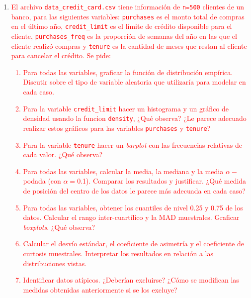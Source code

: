 \documentclass[12pt]{article}%
\begin{document}
\begin{enumerate}
\item  \textcolor{red}{El archivo \texttt{data\_credit\_card.csv} tiene información de \texttt{n=500} clientes de un banco, para las siguientes variables: \texttt{purchases} es el monto total de compras en el último año, \texttt{credit\_limit} es el límite de crédito disponible para el cliente, \texttt{purchases\_freq} es la proporción de semanas del año en las que el cliente realizó compras y \texttt{tenure} es la cantidad de meses que restan al cliente para cancelar el crédito. Se pide:
\begin{enumerate}
\item  Para todas las variables, graficar la función de distribución empírica. Discutir sobre el tipo de variable aleatoria que utilizaría para modelar en cada caso.
\item Para la variable \texttt{credit\_limit} hacer un histograma y un gráfico de densidad usando la funcion \texttt{density}, ¿Qué observa? ¿Le parece adecuado realizar estos gráficos para las variables \texttt{purchases} y \texttt{tenure}?
\item Para la variable \texttt{tenure} hacer un \textit{barplot} con las frecuencias relativas de cada valor. ¿Qué observa?
\item Para todas las variables, calcular la media, la mediana y la media $\alpha-$podada (con $\alpha=$0.1). Comparar los resultados y justificar. ¿Qué medida de posición del centro de los datos le parece más adecuada en cada caso?
\item Para todas las variables, obtener los cuantiles de nivel 0.25 y 0.75 de los datos. Calcular el rango inter-cuartílico y la MAD muestrales. Graficar \textit{boxplots}. ¿Qué observa?
\item Calcular el desvío estándar, el coeficiente de asimetría y el coeficiente de curtosis muestrales. Interpretar los resultados en relación a las distribuciones vistas.
\item Identificar datos atípicos. ¿Deberían excluirse? ¿Cómo se modifican las medidas obtenidas anteriormente si se los excluye?
\end{enumerate}}


\end{enumerate}
\end{document}

